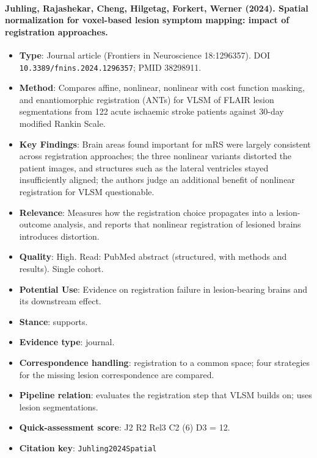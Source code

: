 \documentclass[journal,onecolumn]{IEEEtran}
\begin{document}
\paragraph{Juhling, Rajashekar, Cheng, Hilgetag, Forkert, Werner (2024). Spatial normalization for voxel-based lesion symptom mapping: impact of registration approaches.~\cite{Juhling2024Spatial}}\mbox{}

\begin{itemize}

\item{} \textbf{Type}: Journal article (Frontiers in Neuroscience 18:1296357). DOI \nolinkurl{10.3389/fnins.2024.1296357}; PMID 38298911.

\item{} \textbf{Method}: Compares affine, nonlinear, nonlinear with cost function masking, and enantiomorphic registration (ANTs) for VLSM of FLAIR lesion segmentations from 122 acute ischaemic stroke patients against 30-day modified Rankin Scale.

\item{} \textbf{Key Findings}: Brain areas found important for mRS were largely consistent across registration approaches; the three nonlinear variants distorted the patient images, and structures such as the lateral ventricles stayed insufficiently aligned; the authors judge an additional benefit of nonlinear registration for VLSM questionable.

\item{} \textbf{Relevance}: Measures how the registration choice propagates into a lesion-outcome analysis, and reports that nonlinear registration of lesioned brains introduces distortion.

\item{} \textbf{Quality}: High. Read: PubMed abstract (structured, with methods and results). Single cohort.

\item{} \textbf{Potential Use}: Evidence on registration failure in lesion-bearing brains and its downstream effect.

\item{} \textbf{Stance}: supports.

\item{} \textbf{Evidence type}: journal.

\item{} \textbf{Correspondence handling}: registration to a common space; four strategies for the missing lesion correspondence are compared.

\item{} \textbf{Pipeline relation}: evaluates the registration step that VLSM builds on; uses lesion segmentations.

\item{} \textbf{Quick-assessment score}: J2 R2 Rel3 C2 (6) D3 = 12.

\item{} \textbf{Citation key}: \texttt{Juhling2024Spatial}

\end{itemize}
\end{document}
